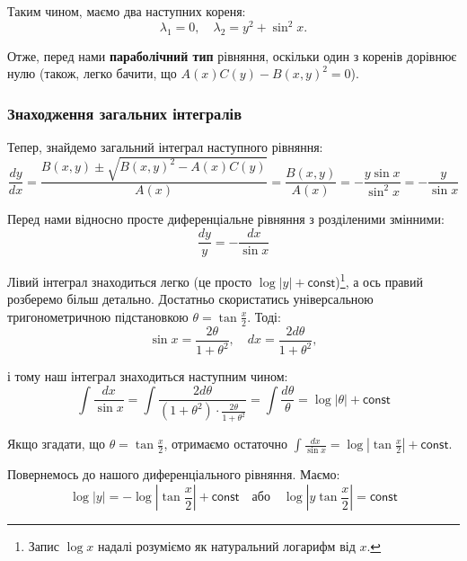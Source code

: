 \documentclass{hw_template}
\begin{document}
Таким чином, маємо два наступних кореня:
\begin{equation*}
    \lambda_1 = 0, \quad \lambda_2 = y^2 + \sin^2 x.
\end{equation*}

Отже, перед нами \textbf{параболічний тип} рівняння, оскільки один з коренів дорівнює нулю (також, легко бачити, що $A(x)C(y)-B(x,y)^2=0$). 

\subsubsection{Знаходження загальних інтегралів}

Тепер, знайдемо загальний інтеграл наступного рівняння:
\begin{equation*}
    \frac{dy}{dx} = \frac{B(x,y)\pm\sqrt{B(x,y)^2-A(x)C(y)}}{A(x)} = \frac{B(x,y)}{A(x)} = -\frac{y\sin x}{\sin^2 x} = -\frac{y}{\sin x}
\end{equation*}

Перед нами відносно просте диференціальне рівняння з розділеними змінними:
\begin{equation*}
    \frac{dy}{y} = -\frac{dx}{\sin x}
\end{equation*}

Лівий інтеграл знаходиться легко (це просто $\log |y|+\mathsf{const}$)\footnote{Запис $\log x$ надалі розуміємо як натуральний логарифм від $x$.}, а ось правий розберемо більш детально. Достатньо скористатись універсальною тригонометричною підстановкою $\theta = \tan \frac{x}{2}$. Тоді:
\begin{equation*}
    \sin x = \frac{2\theta}{1+\theta^2}, \quad dx = \frac{2d\theta}{1+\theta^2},
\end{equation*}

і тому наш інтеграл знаходиться наступним чином:
\begin{equation*}
    \int \frac{dx}{\sin x} = \int \frac{2d\theta}{(1+\theta^2) \cdot \frac{2\theta}{1+\theta^2}} = \int \frac{d\theta}{\theta} = \log |\theta| + \mathsf{const}
\end{equation*}

Якщо згадати, що $\theta = \tan \frac{x}{2}$, отримаємо остаточно $\int \frac{dx}{\sin x} = \log \left|\tan \frac{x}{2}\right| + \mathsf{const}$.

Повернемось до нашого диференціального рівняння. Маємо:
\begin{equation*}
    \log |y| = -\log \left|\tan \frac{x}{2}\right| + \mathsf{const} \quad \text{або} \quad \log \left|y\tan \frac{x}{2}\right| = \mathsf{const}
\end{equation*}
\end{document}
